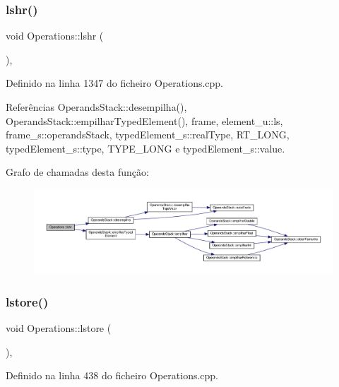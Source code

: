 \subsubsection{\texorpdfstring{lshr()}{lshr()}}
{\footnotesize\ttfamily void Operations\+::lshr (\begin{DoxyParamCaption}{ }\end{DoxyParamCaption})\hspace{0.3cm}{\ttfamily [static]}, {\ttfamily [private]}}



Definido na linha 1347 do ficheiro Operations.\+cpp.



Referências Operands\+Stack\+::desempilha(), Operands\+Stack\+::empilhar\+Typed\+Element(), frame, element\+\_\+u\+::ls, frame\+\_\+s\+::operands\+Stack, typed\+Element\+\_\+s\+::real\+Type, R\+T\+\_\+\+L\+O\+NG, typed\+Element\+\_\+s\+::type, T\+Y\+P\+E\+\_\+\+L\+O\+NG e typed\+Element\+\_\+s\+::value.

Grafo de chamadas desta função\+:\nopagebreak
\begin{figure}[H]
\begin{center}
\leavevmode
\includegraphics[width=350pt]{classOperations_aa886b0d027fb5b030016af6100541e81_cgraph}
\end{center}
\end{figure}
\mbox{\label{classOperations_a233917ec136fa6ce064f04b410e15f87}} 
\subsubsection{\texorpdfstring{lstore()}{lstore()}}
{\footnotesize\ttfamily void Operations\+::lstore (\begin{DoxyParamCaption}{ }\end{DoxyParamCaption})\hspace{0.3cm}{\ttfamily [static]}, {\ttfamily [private]}}



Definido na linha 438 do ficheiro Operations.\+cpp.



